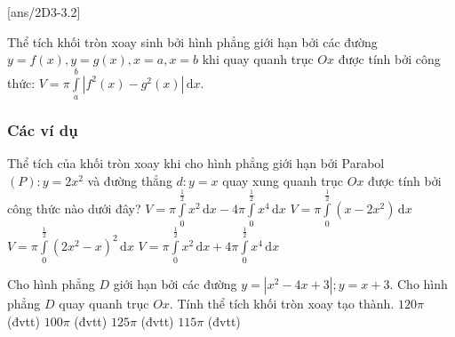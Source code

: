 [ans/2D3-3.2]
\begin{dang}{Thể tích khối tròn xoay sinh bởi hình phẳng giới hạn bởi các đường $y=f(x),y=g(x), x=a, x=b$ khi quay quanh trục $Ox$ được tính bởi công thức: $V=\pi\displaystyle\int\limits_a^b |f^2(x)-g^2(x)| \mathrm{\,d}x$}.
\end{dang}
\subsubsection{Các ví dụ}
\begin{vd}%
	Thể tích của khối tròn xoay khi cho hình phẳng giới hạn bởi Parabol $(P)\colon y=2x^2$ và đường thẳng $d\colon y=x$ quay xung quanh trục $Ox$ được tính bởi công thức nào dưới đây?
	\choice
	{\True $V=\pi\displaystyle\int\limits_0^{\tfrac{1}{2}} x^2\mathrm{\,d}x-4\pi\displaystyle\int\limits_0^{\tfrac{1}{2}} x^4\mathrm{\,d}x$}
	{$V=\pi\displaystyle\int\limits_0^{\tfrac{1}{2}}\left(x-2x^2\right)\mathrm{\,d}x$}
	{$V=\pi\displaystyle\int\limits_0^{\tfrac{1}{2}}\left(2x^2-x\right)^2\mathrm{\,d}x$}
	{$V=\pi\displaystyle\int\limits_0^{\tfrac{1}{2}} x^2\mathrm{\,d}x+4\pi\displaystyle\int\limits_0^{\tfrac{1}{2}} x^4\mathrm{\,d}x$}
\end{vd}
\begin{vd}%
	Cho hình phẳng $D$ giới hạn bởi các đường
	$y=\left|x^2-4x+3\right|;y=x+3$. Cho hình phẳng $D$ quay quanh trục $Ox$. Tính thể tích khối tròn xoay tạo thành. 
	\choice
	{$120\pi$ (đvtt)}
	{$100\pi$ (đvtt)}
	{\True $125\pi$ (đvtt)}
	{$115\pi$ (đvtt)}
\end{vd}
